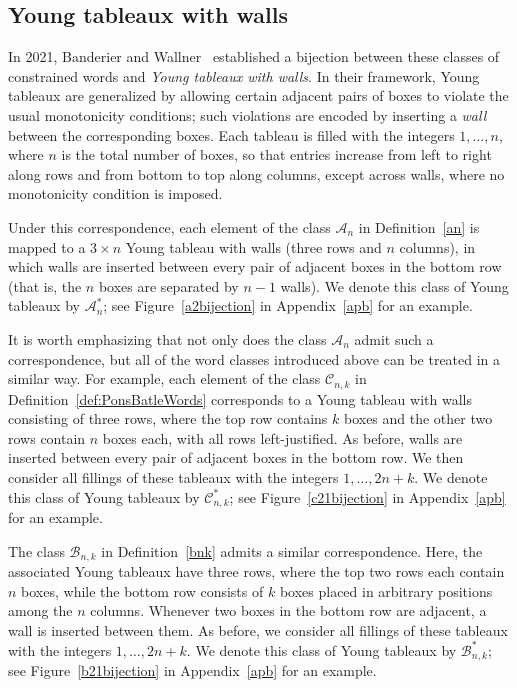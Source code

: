 \documentclass[a4paper,UKenglish,cleveref, autoref, thm-restate]{lipics-v2021}
\begin{document}
\subsection{Young tableaux with walls}

In 2021, Banderier and Wallner~\cite{banderier2021young} established a bijection between these classes of constrained words and \emph{Young tableaux with walls}. In their framework, Young tableaux are generalized by allowing certain adjacent pairs of boxes to violate the usual monotonicity conditions; such violations are encoded by inserting a \emph{wall} between the corresponding boxes. Each tableau is filled with the integers $1,\dots,n$, where $n$ is the total number of boxes, so that entries increase from left to right along rows and from bottom to top along columns, except across walls, where no monotonicity condition is imposed.

Under this correspondence, each element of the class $\mathcal{A}_n$ in Definition~\ref{an} is mapped to a $3\times n$ Young tableau with walls (three rows and $n$ columns), in which walls are inserted between every pair of adjacent boxes in the bottom row (that is, the $n$ boxes are separated by $n-1$ walls). We denote this class of Young tableaux by $\mathcal{A}^*_n$; see Figure~\ref{a2bijection} in Appendix~\ref{apb} for an example.

It is worth emphasizing that not only does the class $\mathcal{A}_n$ admit such a correspondence, but all of the word classes introduced above can be treated in a similar way. For example, each element of the class $\mathcal{C}_{n,k}$ in Definition~\ref{def:PonsBatleWords} corresponds to a Young tableau with walls consisting of three rows, where the top row contains $k$ boxes and the other two rows contain $n$ boxes each, with all rows left-justified. As before, walls are inserted between every pair of adjacent boxes in the bottom row. We then consider all fillings of these tableaux with the integers $1,\dots,2n+k$. We denote this class of Young tableaux by $\mathcal{C}^*_{n,k}$; see Figure~\ref{c21bijection} in Appendix~\ref{apb} for an example. 

The class $\mathcal{B}_{n,k}$ in Definition~\ref{bnk} admits a similar correspondence. Here, the associated Young tableaux have three rows, where the top two rows each contain $n$ boxes, while the bottom row consists of $k$ boxes placed in arbitrary positions among the $n$ columns. Whenever two boxes in the bottom row are adjacent, a wall is inserted between them. As before, we consider all fillings of these tableaux with the integers $1,\dots,2n+k$. We denote this class of Young tableaux by $\mathcal{B}^*_{n,k}$; see Figure~\ref{b21bijection} in Appendix~\ref{apb} for an example.
\end{document}
